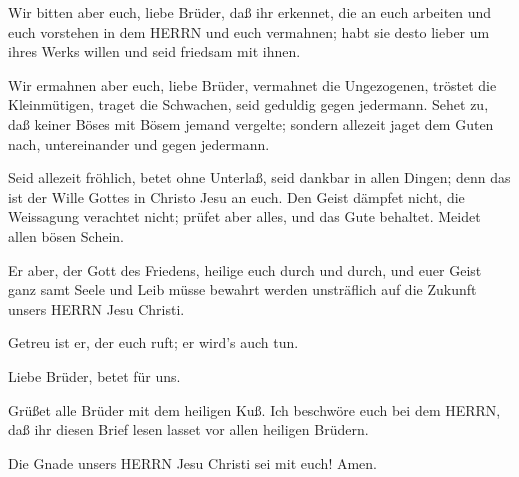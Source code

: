  Wir bitten aber euch, liebe Brüder, daß ihr erkennet, die
an euch arbeiten und euch vorstehen in dem HERRN und euch vermahnen;
 habt sie desto lieber um ihres Werks willen und seid
friedsam mit ihnen.

 Wir ermahnen aber euch, liebe Brüder, vermahnet die
Ungezogenen, tröstet die Kleinmütigen, traget die Schwachen, seid
geduldig gegen jedermann.  Sehet zu, daß keiner Böses mit
Bösem jemand vergelte; sondern allezeit jaget dem Guten nach,
untereinander und gegen jedermann.

 Seid allezeit fröhlich,  betet ohne Unterlaß,
 seid dankbar in allen Dingen; denn das ist der Wille
Gottes in Christo Jesu an euch.  Den Geist dämpfet nicht,
 die Weissagung verachtet nicht;  prüfet aber
alles, und das Gute behaltet.  Meidet allen bösen Schein.

 Er aber, der Gott des Friedens, heilige euch durch und
durch, und euer Geist ganz samt Seele und Leib müsse bewahrt werden
unsträflich auf die Zukunft unsers HERRN Jesu Christi.

 Getreu ist er, der euch ruft; er wird's auch tun.

 Liebe Brüder, betet für uns.

 Grüßet alle Brüder mit dem heiligen Kuß.  Ich
beschwöre euch bei dem HERRN, daß ihr diesen Brief lesen lasset vor
allen heiligen Brüdern.

 Die Gnade unsers HERRN Jesu Christi sei mit euch! Amen.
